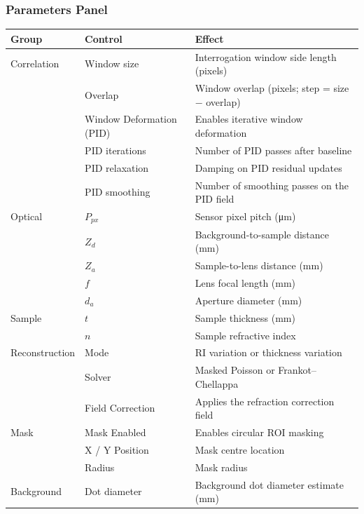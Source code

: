 \documentclass[11pt]{article}
\begin{document}
\subsubsection{Parameters Panel}

\begin{center}
\begin{tabular}{lll}
  \toprule
  \rowcolor{accentlight} Group & Control & Effect \\
  \midrule
  Correlation & Window size & Interrogation window side length (pixels) \\
              & Overlap     & Window overlap (pixels; step = size $-$ overlap) \\
              & Window Deformation (PID) & Enables iterative window deformation \\
              & PID iterations & Number of PID passes after baseline \\
              & PID relaxation & Damping on PID residual updates \\
              & PID smoothing  & Number of smoothing passes on the PID field \\
  \midrule
  Optical     & $P_{px}$       & Sensor pixel pitch (\si{\micro\metre}) \\
              & $Z_d$          & Background-to-sample distance (\si{mm}) \\
              & $Z_a$          & Sample-to-lens distance (\si{mm}) \\
              & $f$            & Lens focal length (\si{mm}) \\
              & $d_a$          & Aperture diameter (\si{mm}) \\
  \midrule
  Sample      & $t$            & Sample thickness (\si{mm}) \\
              & $n$            & Sample refractive index \\
  \midrule
  Reconstruction & Mode        & RI variation or thickness variation \\
                 & Solver      & Masked Poisson or Frankot--Chellappa \\
                 & Field Correction & Applies the refraction correction field \\
  \midrule
  Mask        & Mask Enabled   & Enables circular ROI masking \\
              & X / Y Position & Mask centre location \\
              & Radius         & Mask radius \\
  \midrule
  Background  & Dot diameter   & Background dot diameter estimate (\si{mm}) \\
  \bottomrule
\end{tabular}
\end{center}
\end{document}
